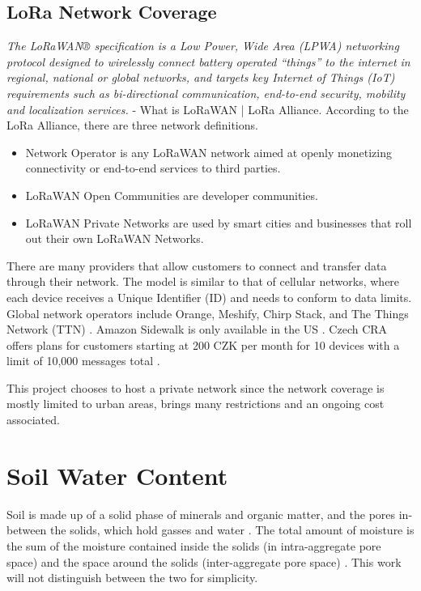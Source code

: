 \subsection{LoRa Network Coverage}
\emph{The LoRaWAN® specification is a Low Power, Wide Area (LPWA) networking protocol designed to wirelessly connect battery operated ``things'' to the internet in regional, national or global networks, and targets key Internet of Things (IoT) requirements such as bi-directional communication, end-to-end security, mobility and localization services.} - What is LoRaWAN | LoRa Alliance. According to the LoRa Alliance, there are three network definitions.
\begin{itemize}
    \item Network Operator is any LoRaWAN network aimed at openly monetizing connectivity or end-to-end services to third parties.
    \item LoRaWAN Open Communities are developer communities.
    \item LoRaWAN Private Networks are used by smart cities and businesses that roll out their own LoRaWAN Networks.
\end{itemize}

There are many providers that allow customers to connect and transfer data through their network. The model is similar to that of cellular networks, where each device receives a Unique Identifier (ID) and needs to conform to data limits. Global network operators include Orange, Meshify, Chirp Stack, and The Things Network (TTN) \cite{the_things_network_things_nodate}. Amazon Sidewalk is only available in the US \cite{amazon_inc_amazoncom_nodate}. Czech CRA offers plans for customers starting at 200 CZK per month for 10 devices with a limit of 10,000 messages total \cite{pixman_sro_objednavate_nodate}.

This project chooses to host a private network since the network coverage is mostly limited to urban areas, brings many restrictions \cite{the_things_network_eu863-870_nodate,the_things_network_message_nodate} and an ongoing cost associated.

\section{Soil Water Content}
Soil is made up of a solid phase of minerals and organic matter, and the pores in-between the solids, which hold gasses and water \cite{paul_soil_2007}. The total amount of moisture is the sum of the moisture contained inside the solids (in intra-aggregate pore space) and the space around the solids (inter-aggregate pore space) \cite{myjove_corporation_determination_2024}. This work will not distinguish between the two for simplicity.


